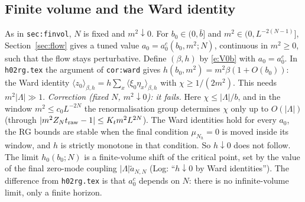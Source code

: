 \documentclass[11pt]{amsart}
\theoremstyle{definition}
\theoremstyle{remark}
\numberwithin{equation}{section}
\newcommand{\avg}[1]{\langle #1\rangle}
\newcommand{\hr}{\texttt{h02rg.tex}}
\begin{document}
\subsection{Finite volume and the Ward identity}
As in \texttt{sec:finvol}, $N$ is fixed and $m^2\downarrow0$. For $b_0\in(0,\bar b]$ and
$m^2\in(0,L^{-2(N-1)}]$, Section~\ref{sec:flow} gives a tuned value $a_0=a_0^c(b_0,m^2;N)$,
continuous in $m^2\ge0$, such that the flow stays perturbative. Define $(\beta,h)$ by
\eqref{e:V0b} with $a_0=a_0^c$. In \hr{} the argument of \texttt{cor:ward} gives $h(b_0,m^2)=m^2\beta(1+O(b_0))$:
the Ward identity $\avg{z_0}_{\beta,h}=h\sum_x\avg{\xi_0\eta_x}_{\beta,h}$ with $\chi\ge1/(2m^2)$. This needs
$m^2|\Lambda|\gg1$. \emph{Correction (fixed $N$, $m^2\downarrow0$): it fails.} Here $\chi\le|\Lambda|/b$, and in the window
$m^2\le c_0L^{-2N}$ the renormalisation group determines $\chi$ only up to $O(|\Lambda|)$ (through $|m^2Z_Nt_{\rm raw}-1|\le K_tm^2L^{2N}$).
The Ward identities hold for every $a_0$, the RG bounds are stable when the final condition $\mu_{N_h}=0$ is moved inside its
window, and $h$ is strictly monotone in that condition. So $h\downarrow0$ does not follow. The limit $h_0(b_0;N)$ is a finite-volume
shift of the critical point, set by the value of the final zero-mode coupling $|\Lambda|\tilde a_{N,N}$ (Log: ``$h\downarrow0$ by Ward identities'').
The difference from \hr{} is that $a_0^c$ depends on $N$: there is no infinite-volume limit, only a finite horizon.
\end{document}
